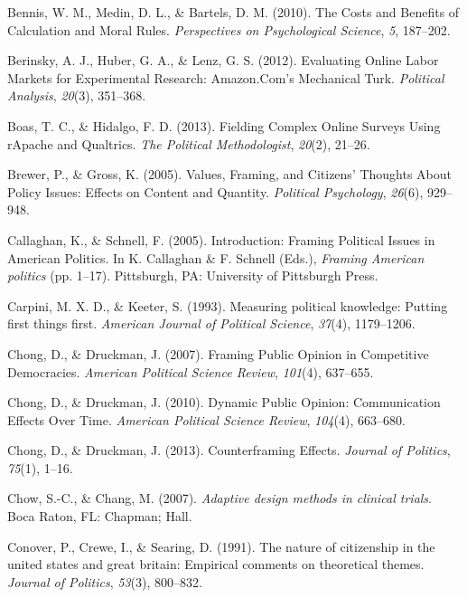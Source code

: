 \documentclass[12pt,econ]{sources/authesis}
\begin{document}
\leavevmode\hypertarget{ref-bennis_costs_2010}{}%
Bennis, W. M., Medin, D. L., \& Bartels, D. M. (2010). The Costs and Benefits of Calculation and Moral Rules. \emph{Perspectives on Psychological Science}, \emph{5}, 187--202.

\leavevmode\hypertarget{ref-berinsky_evaluating_2012}{}%
Berinsky, A. J., Huber, G. A., \& Lenz, G. S. (2012). Evaluating Online Labor Markets for Experimental Research: Amazon.Com's Mechanical Turk. \emph{Political Analysis}, \emph{20}(3), 351--368.

\leavevmode\hypertarget{ref-boas_fielding_2013}{}%
Boas, T. C., \& Hidalgo, F. D. (2013). Fielding Complex Online Surveys Using rApache and Qualtrics. \emph{The Political Methodologist}, \emph{20}(2), 21--26.

\leavevmode\hypertarget{ref-brewer_values_2005}{}%
Brewer, P., \& Gross, K. (2005). Values, Framing, and Citizens' Thoughts About Policy Issues: Effects on Content and Quantity. \emph{Political Psychology}, \emph{26}(6), 929--948.

\leavevmode\hypertarget{ref-callaghan_introduction_2005}{}%
Callaghan, K., \& Schnell, F. (2005). Introduction: Framing Political Issues in American Politics. In K. Callaghan \& F. Schnell (Eds.), \emph{Framing American politics} (pp. 1--17). Pittsburgh, PA: University of Pittsburgh Press.

\leavevmode\hypertarget{ref-carpini_1993_measuring}{}%
Carpini, M. X. D., \& Keeter, S. (1993). Measuring political knowledge: Putting first things first. \emph{American Journal of Political Science}, \emph{37}(4), 1179--1206.

\leavevmode\hypertarget{ref-chong_framing_2007}{}%
Chong, D., \& Druckman, J. (2007). Framing Public Opinion in Competitive Democracies. \emph{American Political Science Review}, \emph{101}(4), 637--655.

\leavevmode\hypertarget{ref-chong_dynamic_2010}{}%
Chong, D., \& Druckman, J. (2010). Dynamic Public Opinion: Communication Effects Over Time. \emph{American Political Science Review}, \emph{104}(4), 663--680.

\leavevmode\hypertarget{ref-chong_counterframing_2013}{}%
Chong, D., \& Druckman, J. (2013). Counterframing Effects. \emph{Journal of Politics}, \emph{75}(1), 1--16.

\leavevmode\hypertarget{ref-chow_2007_adaptive}{}%
Chow, S.-C., \& Chang, M. (2007). \emph{Adaptive design methods in clinical trials}. Boca Raton, FL: Chapman; Hall.

\leavevmode\hypertarget{ref-conover_1991_nature}{}%
Conover, P., Crewe, I., \& Searing, D. (1991). The nature of citizenship in the united states and great britain: Empirical comments on theoretical themes. \emph{Journal of Politics}, \emph{53}(3), 800--832.
\end{document}
